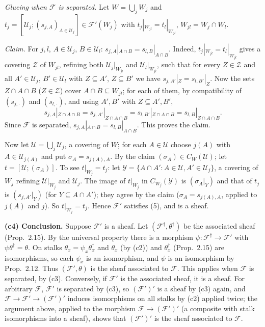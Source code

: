 \documentclass[11pt]{article}
\begin{document}
\emph{Glueing when $\mathcal F$ is separated.} Let $W=\bigcup_jW_j$ and $t_j=[\mathcal U_j;(s_{j,A})_{A\in\mathcal U_j}]\in\mathcal F'(W_j)$ with $t_j|_{W_{jl}}=t_l|_{W_{jl}}$, $W_{jl}=W_j\cap W_l$.

\emph{Claim.} For $j,l$, $A\in\mathcal U_j$, $B\in\mathcal U_l$: $s_{j,A}|_{A\cap B}=s_{l,B}|_{A\cap B}$. Indeed, $t_j|_{W_{jl}}=t_l|_{W_{jl}}$ gives a covering $\mathcal Z$ of $W_{jl}$, refining both $\mathcal U_j|_{W_{jl}}$ and $\mathcal U_l|_{W_{jl}}$, such that for every $Z\in\mathcal Z$ and all $A'\in\mathcal U_j$, $B'\in\mathcal U_l$ with $Z\subseteq A'$, $Z\subseteq B'$ we have $s_{j,A'}|_Z=s_{l,B'}|_Z$. Now the sets $Z\cap A\cap B$ ($Z\in\mathcal Z$) cover $A\cap B\subseteq W_{jl}$; for each of them, by compatibility of $(s_{j,\cdot})$ and $(s_{l,\cdot})$, and using $A',B'$ with $Z\subseteq A',B'$,
\[ s_{j,A}|_{Z\cap A\cap B}=s_{j,A'}|_{Z\cap A\cap B}=s_{l,B'}|_{Z\cap A\cap B}=s_{l,B}|_{Z\cap A\cap B}. \]
Since $\mathcal F$ is separated, $s_{j,A}|_{A\cap B}=s_{l,B}|_{A\cap B}$. This proves the claim.

Now let $\mathcal U=\bigcup_j\mathcal U_j$, a covering of $W$; for each $A\in\mathcal U$ choose $j(A)$ with $A\in\mathcal U_{j(A)}$ and put $\sigma_A=s_{j(A),A}$. By the claim $(\sigma_A)\in C_W(\mathcal U)$; let $t=[\mathcal U;(\sigma_A)]$. To see $t|_{W_j}=t_j$: let $\mathcal Y=\{A\cap A':A\in\mathcal U,A'\in\mathcal U_j\}$, a covering of $W_j$ refining $\mathcal U|_{W_j}$ and $\mathcal U_j$. The image of $t|_{W_j}$ in $C_{W_j}(\mathcal Y)$ is $(\sigma_A|_Y)$ and that of $t_j$ is $(s_{j,A'}|_Y)$ (for $Y\subseteq A\cap A'$); they agree by the claim ($\sigma_A=s_{j(A),A}$, applied to $j(A)$ and $j$). So $t|_{W_j}=t_j$. Hence $\mathcal F'$ satisfies (5), and is a sheaf.

\textbf{(c4) Conclusion.} Suppose $\mathcal F'$ is a sheaf. Let $(\mathcal F^\dagger,\theta^\dagger)$ be the associated sheaf (Prop.~2.15). By the universal property there is a morphism $\psi:\mathcal F^\dagger\to\mathcal F'$ with $\psi\theta^\dagger=\theta$. On stalks $\theta_x=\psi_x\theta^\dagger_x$ and $\theta_x$ (by (c2)) and $\theta^\dagger_x$ (Prop.~2.15) are isomorphisms, so each $\psi_x$ is an isomorphism, and $\psi$ is an isomorphism by Prop.~2.12. Thus $(\mathcal F',\theta)$ is the sheaf associated to $\mathcal F$. This applies when $\mathcal F$ is separated, by (c3). Conversely, if $\mathcal F'$ is the associated sheaf, it is a sheaf. For arbitrary $\mathcal F$, $\mathcal F'$ is separated by (c3), so $(\mathcal F')'$ is a sheaf by (c3) again, and $\mathcal F\to\mathcal F'\to(\mathcal F')'$ induces isomorphisms on all stalks by (c2) applied twice; the argument above, applied to the morphism $\mathcal F\to(\mathcal F')'$ (a composite with stalk isomorphisms into a sheaf), shows that $(\mathcal F')'$ is the sheaf associated to $\mathcal F$.
\end{document}

